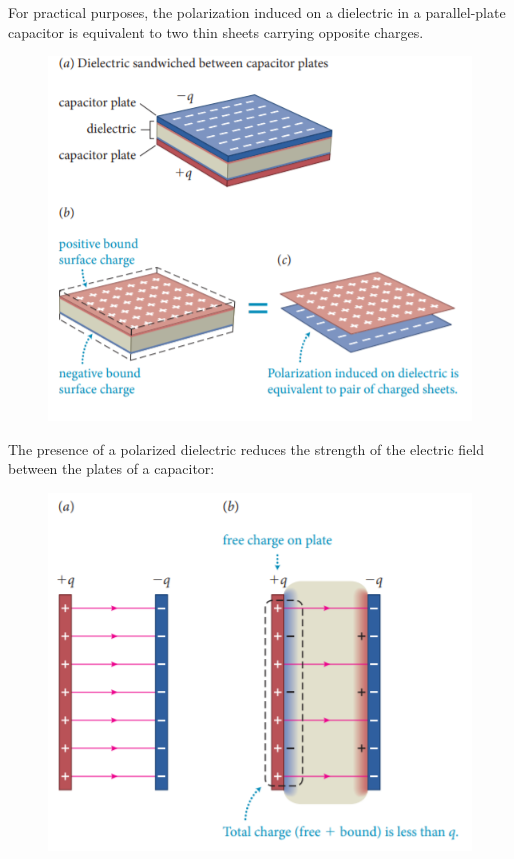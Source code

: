         For practical purposes, the polarization induced on a dielectric in a parallel-plate capacitor is equivalent to two thin sheets carrying opposite charges.

        \begin{figure}[hbt!]
            \centering
            \includegraphics[scale = 0.75]{Resources/26.3_Dielectric_Sandwhich}
        \end{figure}

        The presence of a polarized dielectric reduces the strength of the electric field between the plates of a capacitor:

        \begin{figure}[hbt!]
            \centering
            \includegraphics[scale = 0.75]{Resources/26.3_Dielectric_Polarization}
        \end{figure}

